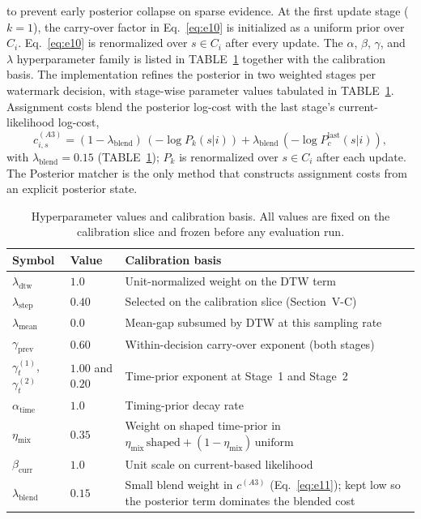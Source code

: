 \documentclass{ieeeaccess}
\begin{document}
    to prevent early posterior collapse on sparse evidence.
    At the first update stage ($k = 1$), the carry-over factor in Eq.~\eqref{eq:e10} is initialized as a uniform prior over $C_i$.
    Eq.~\eqref{eq:e10} is renormalized over $s \in C_i$ after every update.
    The $\alpha$, $\beta$, $\gamma$, and $\lambda$ hyperparameter family is listed in TABLE~\ref{table:hyper} together with the calibration basis.
    The implementation refines the posterior in two weighted stages per watermark decision, with stage-wise parameter values tabulated in TABLE~\ref{table:hyper}.
    Assignment costs blend the posterior log-cost with the last stage's current-likelihood log-cost,
    \begin{equation}\label{eq:e11}
        c^{(A3)}_{i,s} = (1 - \lambda_{\text{blend}})\,(-\log P_k(s|i)) + \lambda_{\text{blend}}\,(-\log P_c^{\text{last}}(s|i)),
    \end{equation}
    with $\lambda_{\text{blend}} = 0.15$ (TABLE~\ref{table:hyper}); $P_k$ is renormalized over $s \in C_i$ after each update.
    The Posterior matcher is the only method that constructs assignment costs from an explicit posterior state.

    \begin{table}[htbp]
    \caption{Hyperparameter values and calibration basis. All values are fixed on the calibration slice and frozen before any evaluation run.}
    \label{table:hyper}
    \centering
    \scriptsize
    \setlength{\tabcolsep}{3pt}
    \begin{tabular}{@{}l l p{4.2cm}@{}}
        \toprule
        \textbf{Symbol} & \textbf{Value} & \textbf{Calibration basis} \\
        \midrule
        $\lambda_{\text{dtw}}$ & $1.0$ & Unit-normalized weight on the DTW term \\
        $\lambda_{\text{step}}$ & $0.40$ & Selected on the calibration slice (Section~V-C) \\
        $\lambda_{\text{mean}}$ & $0.0$ & Mean-gap subsumed by DTW at this sampling rate \\
        $\gamma_{\text{prev}}$ & $0.60$ & Within-decision carry-over exponent (both stages) \\
        $\gamma_t^{(1)}$, $\gamma_t^{(2)}$ & $1.00$ and $0.20$ & Time-prior exponent at Stage~1 and Stage~2 \\
        $\alpha_{\text{time}}$ & $1.0$ & Timing-prior decay rate \\
        $\eta_{\text{mix}}$ & $0.35$ & Weight on shaped time-prior in $\eta_{\text{mix}}\,\text{shaped}+(1{-}\eta_{\text{mix}})\,\text{uniform}$ \\
        $\beta_{\text{curr}}$ & $1.0$ & Unit scale on current-based likelihood \\
        $\lambda_{\text{blend}}$ & $0.15$ & Small blend weight in $c^{(A3)}$ (Eq.~\eqref{eq:e11}); kept low so the posterior term dominates the blended cost \\
        \bottomrule
    \end{tabular}
    \end{table}
\end{document}
